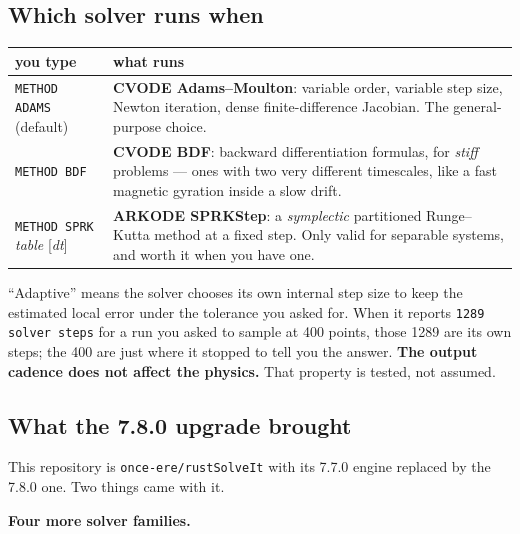 \documentclass[11pt]{article}
\newcommand{\kw}[1]{\texttt{\uppercase{#1}}}
\newcommand{\code}[1]{\texttt{#1}}
\begin{document}
\subsection{Which solver runs when}

\begin{center}
\begin{tabular}{p{4.2cm}p{10.4cm}}
\textbf{you type} & \textbf{what runs}\\\hline
\kw{method adams} (default) & \textbf{CVODE Adams--Moulton}: variable
order, variable step size, Newton iteration, dense finite-difference
Jacobian. The general-purpose choice.\\
\kw{method bdf} & \textbf{CVODE BDF}: backward differentiation formulas,
for \emph{stiff} problems --- ones with two very different timescales,
like a fast magnetic gyration inside a slow drift.\\
\kw{method sprk} \emph{table} [\emph{dt}] & \textbf{ARKODE SPRKStep}: a
\emph{symplectic} partitioned Runge--Kutta method at a fixed step. Only
valid for separable systems, and worth it when you have one.\\
\end{tabular}
\end{center}

``Adaptive'' means the solver chooses its own internal step size to keep
the estimated local error under the tolerance you asked for. When it
reports \code{1289 solver steps} for a run you asked to sample at 400
points, those 1289 are its own steps; the 400 are just where it stopped
to tell you the answer. \textbf{The output cadence does not affect the
physics.} That property is tested, not assumed.

\subsection{What the 7.8.0 upgrade brought}

This repository is \code{once-ere/rustSolveIt} with its 7.7.0 engine
replaced by the 7.8.0 one. Two things came with it.

\textbf{Four more solver families.}
\end{document}
